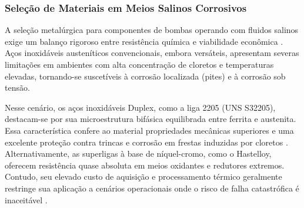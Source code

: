 \subsubsection{Seleção de Materiais em Meios Salinos Corrosivos}
\label{subsec:material}

A seleção metalúrgica para componentes de bombas operando com fluidos salinos exige um balanço rigoroso entre resistência química e viabilidade econômica \cite{Morrow2011}. Aços inoxidáveis austeníticos convencionais, embora versáteis, apresentam severas limitações em ambientes com alta concentração de cloretos e temperaturas elevadas, tornando-se suscetíveis à corrosão localizada (pites) e à corrosão sob tensão.

Nesse cenário, os aços inoxidáveis Duplex, como a liga 2205 (UNS S32205), destacam-se por sua microestrutura bifásica equilibrada entre ferrita e austenita. Essa característica confere ao material propriedades mecânicas superiores e uma excelente proteção contra trincas e corrosão em frestas induzidas por cloretos \cite{JamesFritz2020, Langhe2025}. Alternativamente, as superligas à base de níquel-cromo, como o Hastelloy, oferecem resistência quase absoluta em meios oxidantes e redutores extremos. Contudo, seu elevado custo de aquisição e processamento térmico geralmente restringe sua aplicação a cenários operacionais onde o risco de falha catastrófica é inaceitável \cite{Artizono2024}.
